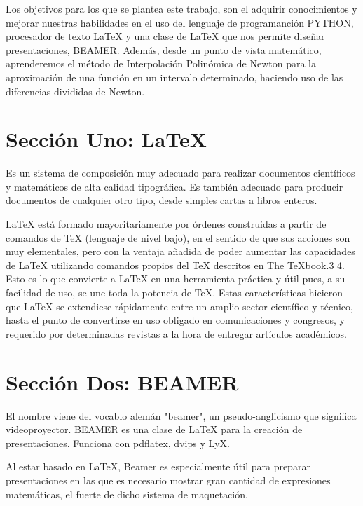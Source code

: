
Los objetivos para los que se plantea este trabajo, son el adquirir conocimientos y mejorar nuestras habilidades en el uso del lenguaje de programanción PYTHON, procesador de texto \LaTeX{} y una clase de \LaTeX{} que nos permite diseñar presentaciones, BEAMER. Además, desde un punto de vista matemático, aprenderemos el método de Interpolación Polinómica de Newton para la aproximación de una función en un intervalo determinado, haciendo uso de las diferencias divididas de Newton.
\section{Sección Uno: \LaTeX}
\label{1:sec:1}
 Es un sistema de composición muy adecuado para realizar documentos científicos y matemáticos de alta calidad tipográfica. Es también adecuado para producir documentos de cualquier otro tipo, desde simples cartas a libros enteros.\par\LaTeX{} está formado mayoritariamente por órdenes construidas a partir de comandos de \TeX{} (lenguaje de nivel bajo), en el sentido de que sus acciones son muy elementales, pero con la ventaja añadida de poder aumentar las capacidades de \LaTeX{} utilizando comandos propios del \TeX{} descritos en The TeXbook.3 4. Esto es lo que convierte a \LaTeX{} en una herramienta práctica y útil pues, a su facilidad de uso, se une toda la potencia de \TeX{}. Estas características hicieron que \LaTeX{} se extendiese rápidamente entre un amplio sector científico y técnico, hasta el punto de convertirse en uso obligado en comunicaciones y congresos, y requerido por determinadas revistas a la hora de entregar artículos académicos.
\section{Sección Dos: BEAMER}
\label{1:sec:2}
El nombre viene del vocablo alemán "beamer", un pseudo-anglicismo que significa videoproyector. BEAMER es una clase de \LaTeX{} para la creación de presentaciones. Funciona con pdflatex, dvips y LyX.\par Al estar basado en LaTeX, Beamer es especialmente útil para preparar presentaciones en las que es necesario mostrar gran cantidad de expresiones matemáticas, el fuerte de dicho sistema de maquetación.
